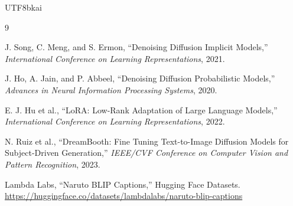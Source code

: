 \documentclass[11pt,a4paper]{article}
\begin{document}
\begin{CJK*}{UTF8}{bkai}
\begin{thebibliography}{9}

J. Song, C. Meng, and S. Ermon,
``Denoising Diffusion Implicit Models,''
\textit{International Conference on Learning Representations}, 2021.

J. Ho, A. Jain, and P. Abbeel,
``Denoising Diffusion Probabilistic Models,''
\textit{Advances in Neural Information Processing Systems}, 2020.

E. J. Hu et al.,
``LoRA: Low-Rank Adaptation of Large Language Models,''
\textit{International Conference on Learning Representations}, 2022.

N. Ruiz et al.,
``DreamBooth: Fine Tuning Text-to-Image Diffusion Models for Subject-Driven Generation,''
\textit{IEEE/CVF Conference on Computer Vision and Pattern Recognition}, 2023.

Lambda Labs,
``Naruto BLIP Captions,'' Hugging Face Datasets.\newline
\url{https://huggingface.co/datasets/lambdalabs/naruto-blip-captions}

\end{thebibliography}

\end{CJK*}
\end{document}
